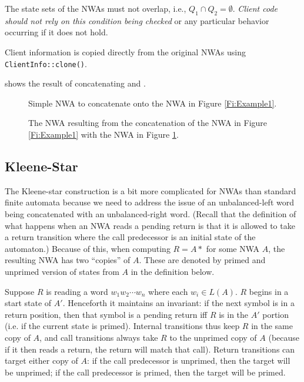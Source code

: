 The state sets of the NWAs must not overlap,
i.e., $Q_1 \cap Q_2 = \emptyset$. \textsl{Client code should not rely on
  this condition being checked} or any particular behavior occurring if it
does not hold.

Client information is copied directly from the original NWAs using
\texttt{ClientInfo::clone()}.

 shows the result of concatenating  and
.



\begin{figure}[p]
  \centering
  \caption{Simple NWA to concatenate onto the NWA in Figure \ref{Fi:Example1}.}
  \label{Fi:Concat1}
\end{figure}

\begin{figure}[p]
  \centering
  \caption{The NWA resulting from the concatenation of the NWA in Figure
    \ref{Fi:Example1} with the NWA in Figure \ref{Fi:Concat1}.}
  \label{Fi:Concat2}
\end{figure}


\subsection{Kleene-Star}
\label{Se:Star}

The Kleene-star construction is a bit more complicated for NWAs than standard
finite automata because we need to address the issue of an unbalanced-left
word being concatenated with an unbalanced-right word.  (Recall that the
definition of what happens when an NWA reads a pending return is that it is
allowed to take a return transition where the call predecessor is an initial
state of the automaton.)  Because of this, when computing $R = A*$ for some
NWA $A$, the resulting NWA has two ``copies'' of $A$. These are denoted by
primed and unprimed version of states from $A$ in the definition below. 

Suppose $R$ is reading a word $w_1w_2\cdots w_n$ where each $w_i \in
L(A)$. $R$ begins in a start state of $A'$. Henceforth it maintains an
invariant: if the next symbol is in a return position, then that symbol is a
pending return iff $R$ is in the $A'$ portion (i.e. if the current state is
primed). Internal transitions thus keep $R$ in the same copy of $A$, and call
transitions always take $R$ to the unprimed copy of $A$ (because if it then
reads a return, the return will match that call). Return transitions can
target either copy of $A$: if the call predecessor is unprimed, then the
target will be unprimed; if the call predecessor is primed, then the target
will be primed.

